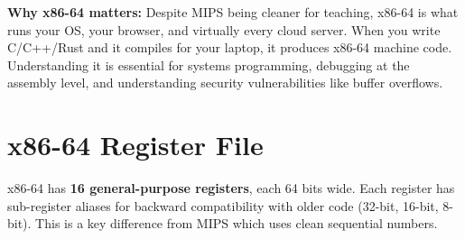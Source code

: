 \documentclass[11pt, letterpaper]{article}
\begin{document}
\begin{tcolorbox}[colback=part6bg, colframe=sectionred, arc=3pt, boxrule=1pt]
\textbf{Why x86-64 matters:} Despite MIPS being cleaner for teaching, x86-64 is what runs your OS, your browser, and virtually every cloud server. When you write C/C++/Rust and it compiles for your laptop, it produces x86-64 machine code. Understanding it is essential for systems programming, debugging at the assembly level, and understanding security vulnerabilities like buffer overflows.
\end{tcolorbox}

\section*{x86-64 Register File}

x86-64 has \textbf{16 general-purpose registers}, each 64 bits wide. Each register has sub-register aliases for backward compatibility with older code (32-bit, 16-bit, 8-bit). This is a key difference from MIPS which uses clean sequential numbers.
\end{document}
